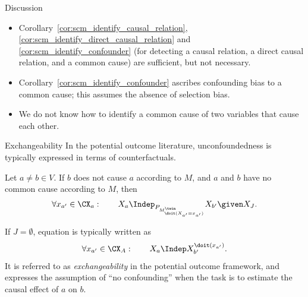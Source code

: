 \begin{frame}{Discussion}
  \begin{itemize}
    \item
      Corollary~\ref{cor:scm_identify_causal_relation}, \ref{cor:scm_identify_direct_causal_relation} and \ref{cor:scm_identify_confounder}
      (for detecting a causal relation, a direct causal relation, and a common cause)
      are sufficient, but not necessary.
    \item Corollary~\ref{cor:scm_identify_confounder} ascribes confounding bias to a common cause;
      this assumes the absence of selection bias.
    \item We do not know how to identify a common cause of two variables that cause each other.
  \end{itemize}
\end{frame}

\begin{frame}{Exchangeability}
In the potential outcome literature, unconfoundedness is typically expressed in terms of counterfactuals.
\begin{Prp}[\ref{prp:potential_outcome_unconfoundedness}]
Let $a \ne b \in V$.
If $b$ does not cause $a$ according to $M$, and $a$ and $b$ have no common cause according to $M$, then
  \begin{equation}\label{slides-eq:potential_outcome_unconfoundedness}
    \forall x_{a'} \in \CX_a: \qquad X_a \Indep_{P_{M^\twin_{\doit(X_{a'}=x_{a'})}}} X_{b'} \given X_J.
  \end{equation}
\end{Prp}
If $J = \emptyset$, equation  is typically written as
  $$\forall x_{a'} \in \CX_A : \qquad X_a \Indep X_{b'}^{\doit(x_{a'})}.$$
It is referred to as \emph{exchangeability} in the potential outcome framework, and 
expresses the assumption of ``no confounding'' when the task is to estimate the causal effect of $a$ on $b$. 
\end{frame}

